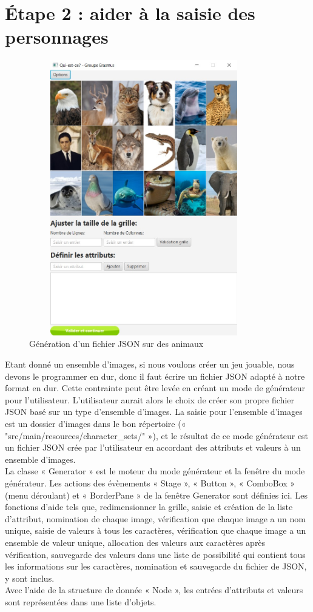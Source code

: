 \documentclass[a4paper]{article}
\begin{document}
\section{Étape 2 : aider  à la saisie  des personnages}

\begin{figure}[ht]
    \centering
    \includegraphics[width= 10cm, height=12cm]{generator game.jpg}
    \caption{Génération d'un fichier JSON sur des animaux}
\end{figure}

Etant donné un ensemble d'images, si nous voulons créer un jeu jouable, nous devons le programmer en dur, donc il faut écrire un fichier JSON adapté à notre format en dur. Cette contrainte peut être levée en créant un mode de générateur pour l’utilisateur. L’utilisateur aurait alors le choix de créer son propre fichier JSON basé sur un type d’ensemble d’images. La saisie pour l’ensemble d’images est un dossier d’images dans le bon répertoire (« "src/main/resources/character\_sets/" »), et le résultat de ce mode générateur est un fichier JSON crée par l’utilisateur en accordant des attributs et valeurs à un ensemble d’images.\\

La classe « Generator » est le moteur du mode générateur et la fenêtre du mode générateur. Les actions des évènements « Stage », « Button », « ComboBox » (menu déroulant) et « BorderPane » de la fenêtre Generator sont définies ici. Les fonctions d’aide tels que, redimensionner la grille, saisie et création de la liste d’attribut, nomination de chaque image, vérification que chaque image a un nom unique, saisie de valeurs à tous les caractères, vérification que chaque image a un ensemble de valeur unique, allocation des valeurs aux caractères après vérification, sauvegarde des valeurs dans une liste de possibilité qui contient tous les informations sur les caractères, nomination et sauvegarde du fichier de JSON, y sont inclus.\\
Avec l’aide de la structure de donnée « Node », les entrées d’attributs et valeurs sont représentées dans une liste d'objets.\\
\end{document}
